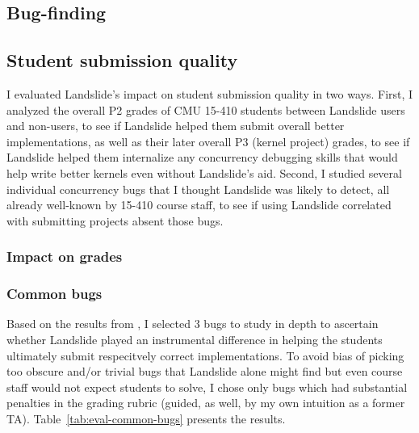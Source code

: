 \subsection{Bug-finding}
\label{sec:education-eval-bugfinding}

\subsection{Student submission quality}

I evaluated Landslide's impact on student submission quality in two ways.
First, I analyzed the overall P2 grades of CMU 15-410 students between Landslide users and non-users,
to see if Landslide helped them submit overall better implementations,
as well as their later overall P3 (kernel project) grades,
to see if Landslide helped them internalize any concurrency debugging skills
that would help write better kernels even without Landslide's aid.
%
Second, I studied
several %
individual concurrency bugs that I thought Landslide was likely to detect,
all already well-known by 15-410 course staff,
to see if using Landslide correlated with submitting projects absent those bugs.

\subsubsection{Impact on grades}


\subsubsection{Common bugs}

Based on the results from \sect{\ref{sec:education-eval-bugfinding}},
I selected 3 bugs to study in depth to ascertain
whether Landslide played an instrumental difference
in helping the students ultimately submit respecitvely correct implementations.
To avoid bias of picking too obscure and/or trivial bugs
that Landslide alone might find but even course staff would not expect students to solve,
I chose only bugs which had substantial penalties in the grading rubric
(guided, as well, by my own intuition as a former TA).
Table~\ref{tab:eval-common-bugs} presents the results.

